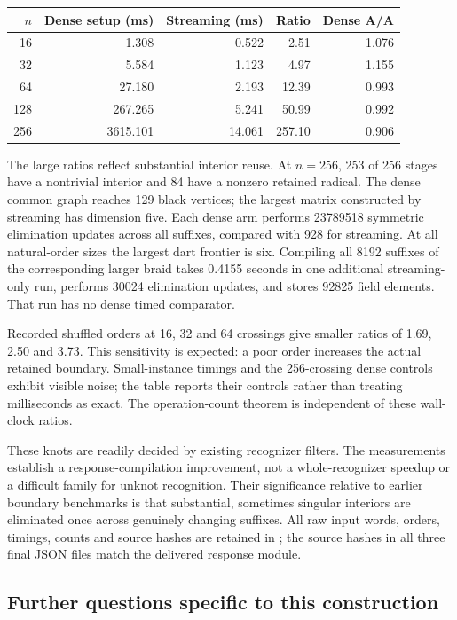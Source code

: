 \begin{center}
\begin{tabular}{r|r|r|r|r}
$n$ & Dense setup (ms) & Streaming (ms) & Ratio & Dense A/A\\\hline
16 & 1.308 & 0.522 & 2.51 & 1.076\\
32 & 5.584 & 1.123 & 4.97 & 1.155\\
64 & 27.180 & 2.193 & 12.39 & 0.993\\
128 & 267.265 & 5.241 & 50.99 & 0.992\\
256 & 3615.101 & 14.061 & 257.10 & 0.906
\end{tabular}
\end{center}

The large ratios reflect substantial interior reuse.  At $n=256$,
253 of 256 stages have a nontrivial interior and 84 have a nonzero
retained radical.  The dense common graph reaches 129 black vertices;
the largest matrix constructed by streaming has dimension five.
Each dense arm performs 23789518 symmetric elimination updates across
all suffixes, compared with 928 for streaming. At all natural-order sizes
the largest dart frontier is six.  Compiling all 8192 suffixes of the
corresponding larger braid takes 0.4155 seconds in one additional
streaming-only run, performs 30024 elimination updates, and stores
92825 field elements.  That run has no dense timed comparator.

Recorded shuffled orders at 16, 32 and 64 crossings give smaller ratios
of 1.69, 2.50 and 3.73.  This sensitivity is expected: a poor order
increases the actual retained boundary.  Small-instance timings and
the 256-crossing dense controls exhibit visible noise; the table
reports their controls rather than treating milliseconds as exact.
The operation-count theorem is independent of these wall-clock ratios.

These knots are readily decided by existing recognizer filters.
The measurements establish a response-compilation improvement, not a
whole-recognizer speedup or a difficult family for unknot recognition.
Their significance relative to earlier boundary benchmarks is that
substantial, sometimes singular interiors are eliminated once across
genuinely changing suffixes.  All raw input words, orders, timings,
counts and source hashes are retained in
; the source hashes in
all three final JSON files match the delivered response module.

\subsection{Further questions specific to this construction}

